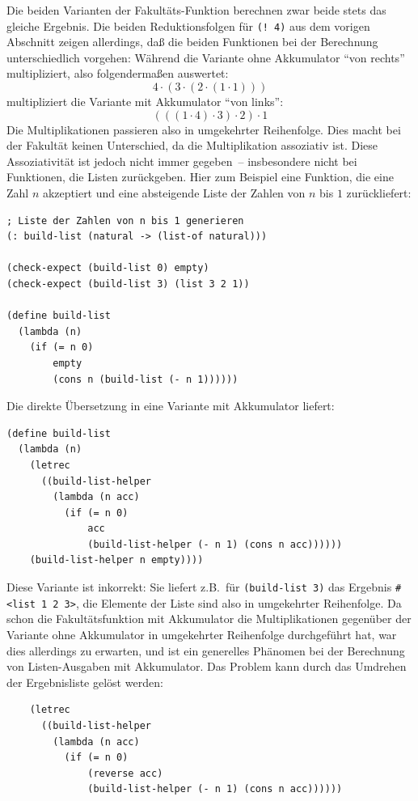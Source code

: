 Die beiden Varianten der Fakultäts-Funktion berechnen zwar beide 
stets das gleiche Ergebnis.  Die beiden Reduktionsfolgen für
\texttt{(! 4)} aus dem vorigen Abschnitt zeigen allerdings, daß die
beiden Funktionen bei der Berechnung unterschiedlich vorgehen:
Während die Variante ohne Akkumulator "`von rechts"' multipliziert,
also folgendermaßen auswertet:
%
\begin{displaymath}
  4\cdot (3 \cdot (2 \cdot (1 \cdot 1)))
\end{displaymath}
%
multipliziert die Variante mit Akkumulator "`von links"':
%
\begin{displaymath}
  (((1 \cdot 4)\cdot 3)\cdot 2)\cdot 1
\end{displaymath}
%
Die Multiplikationen passieren also in umgekehrter Reihenfolge.
Dies macht bei der Fakultät keinen Unterschied, da die Multiplikation
assoziativ ist.  Diese Assoziativität ist jedoch nicht immer
gegeben~-- insbesondere nicht bei Funktionen, die Listen zurückgeben.
Hier zum Beispiel eine Funktion, die eine Zahl $n$ akzeptiert und eine
absteigende Liste der Zahlen von $n$ bis $1$ zurückliefert:
%
\begin{verbatim}
; Liste der Zahlen von n bis 1 generieren
(: build-list (natural -> (list-of natural)))

(check-expect (build-list 0) empty)
(check-expect (build-list 3) (list 3 2 1))

(define build-list
  (lambda (n)
    (if (= n 0)
        empty
        (cons n (build-list (- n 1))))))
\end{verbatim}
%
Die direkte Übersetzung in eine Variante mit Akkumulator liefert:
%
\begin{verbatim}
(define build-list
  (lambda (n)
    (letrec
      ((build-list-helper
        (lambda (n acc)
          (if (= n 0)
              acc
              (build-list-helper (- n 1) (cons n acc))))))
    (build-list-helper n empty))))
\end{verbatim}
%
Diese Variante ist inkorrekt: Sie liefert z.B.\ für
\texttt{(build-list 3)} das Ergebnis \verb|#<list 1 2 3>|, die
Elemente der Liste sind also in umgekehrter Reihenfolge.  Da schon die
Fakultätsfunktion mit Akkumulator die Multiplikationen gegenüber der
Variante ohne Akkumulator in umgekehrter Reihenfolge durchgeführt hat, war dies allerdings zu
erwarten, und ist ein generelles Phänomen bei der Berechnung von
Listen-Ausgaben mit Akkumulator.  Das Problem kann durch das Umdrehen
der Ergebnisliste gelöst werden:
%
\begin{verbatim}
    (letrec
      ((build-list-helper
        (lambda (n acc)
          (if (= n 0)
              (reverse acc)
              (build-list-helper (- n 1) (cons n acc))))))
\end{verbatim}
%


